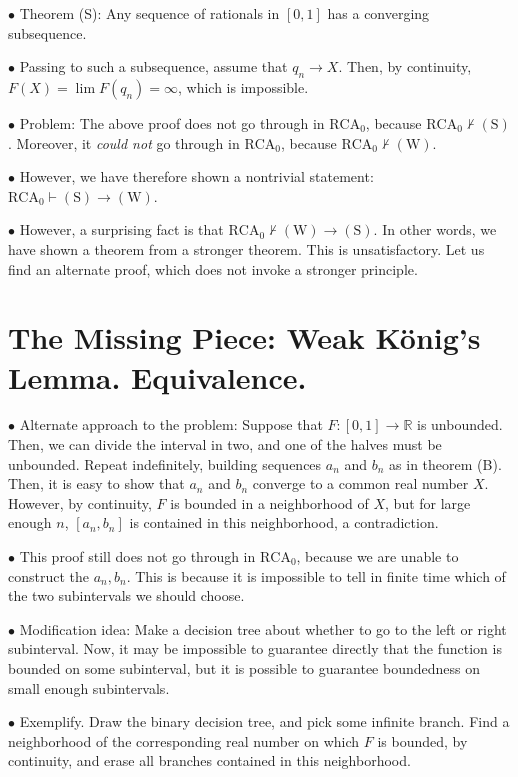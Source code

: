 \documentclass{article}
\theoremstyle{nonumberplain}
\newcommand{\R}{\mathbb{R}}
\newcommand{\RCA}{\mathrm{RCA}}
\newcommand\point[1]{\noindent \hspace{\labelsep} $\bullet$ #1 \smallskip}
\newcommand\thname[1]{\mathrm{(#1)}}
\begin{document}
\point{Theorem (S): Any sequence of rationals in $[0,1]$ has a converging subsequence.}

\point{Passing to such a subsequence, assume that $q_n \to X$. Then, by continuity, $F(X) = \lim F(q_n) = \infty$, which is impossible.}

\point{Problem: The above proof does not go through in $\RCA_0$, because $\RCA_0 \nvdash \thname{S}$. Moreover, it \emph{could not} go through in $\RCA_0$, because $\RCA_0 \nvdash \thname{W}$.}

\point{However, we have therefore shown a nontrivial statement: $\RCA_0 \vdash \thname S \rightarrow \thname W$.}

\point{However, a surprising fact is that $\RCA_0 \nvdash \thname W \rightarrow \thname S$. In other words, we have shown a theorem from a stronger theorem. This is unsatisfactory. Let us find an alternate proof, which does not invoke a stronger principle.}

\section{The Missing Piece: Weak König's Lemma. Equivalence.}

\point{Alternate approach to the problem: Suppose that $F \colon [0,1] \to \R$ is unbounded. Then, we can divide the interval in two, and one of the halves must be unbounded. Repeat indefinitely, building sequences $a_n$ and $b_n$ as in theorem (B). Then, it is easy to show that $a_n$ and $b_n$ converge to a common real number $X$. However, by continuity, $F$ is bounded in a neighborhood of $X$, but for large enough $n$, $[a_n, b_n]$ is contained in this neighborhood, a contradiction.}

\point{This proof still does not go through in $\RCA_0$, because we are unable to construct the $a_n, b_n$. This is because it is impossible to tell in finite time which of the two subintervals we should choose.}

\point{Modification idea: Make a decision tree about whether to go to the left or right subinterval. Now, it may be impossible to guarantee directly that the function is bounded on some subinterval, but it is possible to guarantee boundedness on small enough subintervals.}

\point{Exemplify. Draw the binary decision tree, and pick some infinite branch. Find a neighborhood of the corresponding real number on which $F$ is bounded, by continuity, and erase all branches contained in this neighborhood.}
\end{document}
